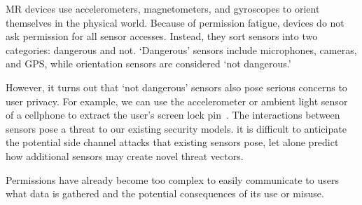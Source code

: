 MR devices use accelerometers, magnetometers, and gyroscopes to orient themselves in the physical world. Because of permission fatigue, devices do not ask permission for all sensor accesses. Instead, they sort sensors into two categories: dangerous and not. `Dangerous' sensors include microphones, cameras, and GPS, while orientation sensors are considered `not dangerous.'

However, it turns out that `not dangerous' sensors also pose serious concerns to user privacy. For example, we can use the accelerometer or ambient light sensor of a cellphone to extract the user's screen lock pin~\cite{aviv2012practicality, spreitzer2018systematic}. The interactions between sensors pose a threat to our existing security models. it is difficult to anticipate the potential side channel attacks that existing sensors pose, let alone predict how additional sensors may create novel threat vectors.

Permissions have already become too complex to easily communicate to users what data is gathered and the potential consequences of its use or misuse.


